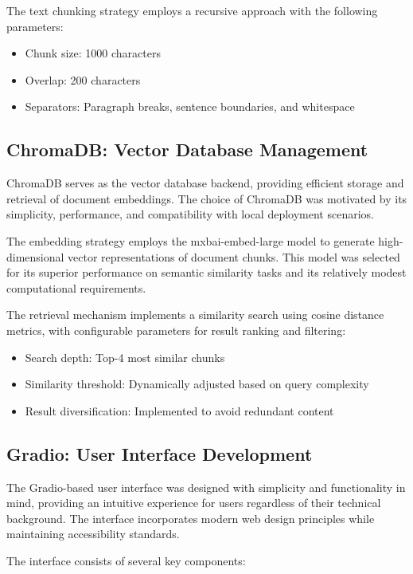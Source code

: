 \documentclass[12pt,letterpaper]{article}
\begin{document}
The text chunking strategy employs a recursive approach with the following parameters:
\begin{itemize}
    \item Chunk size: 1000 characters
    \item Overlap: 200 characters
    \item Separators: Paragraph breaks, sentence boundaries, and whitespace
\end{itemize}

\subsection{ChromaDB: Vector Database Management}

ChromaDB serves as the vector database backend, providing efficient storage and retrieval of document embeddings. The choice of ChromaDB was motivated by its simplicity, performance, and compatibility with local deployment scenarios.

The embedding strategy employs the mxbai-embed-large model to generate high-dimensional vector representations of document chunks. This model was selected for its superior performance on semantic similarity tasks and its relatively modest computational requirements.

The retrieval mechanism implements a similarity search using cosine distance metrics, with configurable parameters for result ranking and filtering:

\begin{itemize}
    \item Search depth: Top-4 most similar chunks
    \item Similarity threshold: Dynamically adjusted based on query complexity
    \item Result diversification: Implemented to avoid redundant content
\end{itemize}

\subsection{Gradio: User Interface Development}

The Gradio-based user interface was designed with simplicity and functionality in mind, providing an intuitive experience for users regardless of their technical background. The interface incorporates modern web design principles while maintaining accessibility standards.

The interface consists of several key components:
\end{document}
